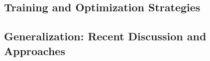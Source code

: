     \subsection{Training and Optimization Strategies} %

    \subsection{Generalization: Recent Discussion and Approaches} %

